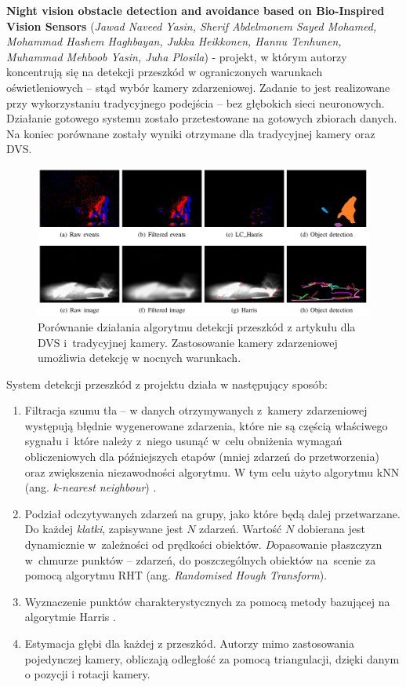 \textbf{Night vision obstacle detection and avoidance based on Bio-Inspired Vision Sensors} (\textit{Jawad Naveed Yasin,
                  Sherif Abdelmonem Sayed Mohamed,
                  Mohammad Hashem Haghbayan,
                  Jukka Heikkonen,
                  Hannu Tenhunen,
                  Muhammad Mehboob Yasin,
                  Juha Plosila}) \cite{night_obstacle} -
    projekt, w którym autorzy koncentrują się na detekcji przeszkód w ograniczonych warunkach oświetleniowych -- stąd wybór kamery zdarzeniowej. Zadanie to jest realizowane przy wykorzystaniu tradycyjnego podejścia -- bez głębokich sieci neuronowych. Działanie gotowego systemu zostało przetestowane na gotowych zbiorach danych. Na koniec porównane zostały wyniki otrzymane dla tradycyjnej kamery oraz DVS.

\begin{figure}
    \centering
    \includegraphics[width=0.8\linewidth]{images/night_obstacle.png}
    \caption{Porównanie działania algorytmu detekcji przeszkód z artykułu \cite{night_obstacle} dla DVS i~tradycyjnej kamery. Zastosowanie kamery zdarzeniowej umożliwia detekcję w nocnych warunkach.}
    \label{fig:night_obstacle}
\end{figure}

System detekcji przeszkód z projektu \cite{night_obstacle} działa w następujący sposób:
\begin{enumerate}
    \item Filtracja szumu tła -- w danych otrzymywanych z~kamery zdarzeniowej występują błędnie wygenerowane zdarzenia, które nie są częścią właściwego sygnału i~które należy z~niego usunąć w~celu obniżenia wymagań obliczeniowych dla późniejszych etapów (mniej zdarzeń do przetworzenia) oraz zwiększenia niezawodności algorytmu. W tym celu użyto algorytmu kNN (ang. \textit{k-nearest neighbour}) \cite{dba_filter}.
    \item Podział odczytywanych zdarzeń na grupy, jako które będą dalej przetwarzane. Do każdej \textit{klatki}, zapisywane jest $N$ zdarzeń. Wartość $N$ dobierana jest dynamicznie w~zależności od prędkości obiektów.
    \textit Dopasowanie płaszczyzn w~chmurze punktów -- zdarzeń, do poszczególnych obiektów na~scenie za pomocą algorytmu RHT (ang. \textit{Randomised Hough Transform}).
    \item Wyznaczenie punktów charakterystycznych za pomocą metody bazującej na algorytmie Harris \cite{Harris}. 
    \item Estymacja głębi dla każdej z przeszkód. Autorzy mimo zastosowania pojedynczej kamery, obliczają odległość za pomocą triangulacji, dzięki danym o pozycji i rotacji kamery.
\end{enumerate}

